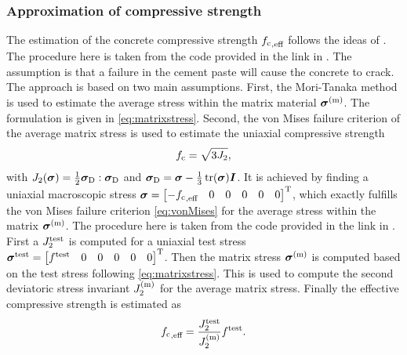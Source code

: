 \subsubsection{Approximation of compressive strength}\label{ssec:compressivestrength}
The estimation of the concrete compressive strength ${f_{\text{c}}}_{,\text{eff}}$ follows the ideas of \cite{nev_2018_mcam}.
The procedure here is taken from the code provided in the link in \cite{nee_2012_ammf}.
The assumption is that a failure in the cement paste will cause the concrete to crack.
The approach is based on two main assumptions.
First, the Mori-Tanaka method is used to estimate the average stress within the matrix material $\boldsymbol{\sigma}^{(\text{m})}$. 
The formulation is given in \eqref{eq:matrixstress}.
Second, the von Mises failure criterion of the average matrix stress is used to estimate the uniaxial compressive strength
\begin{align}
	{f_{\text{c}}} = \sqrt{3 J_2},  \label{eq:vonMises}
\end{align}
with $J_2(\boldsymbol{\sigma}) = \frac{1}{2} \boldsymbol{\sigma}_{\text{D}}:\boldsymbol{\sigma}_{\text{D}}$ and $\boldsymbol{\sigma}_{\text{D}} = \boldsymbol{\sigma} - \frac{1}{3}\operatorname{tr}(\boldsymbol{\sigma})\boldsymbol{I}$.
It is achieved by finding a uniaxial macroscopic stress $\boldsymbol{\sigma} = \begin{bmatrix} -{f_{\text{c}}}_{,\text{eff}} & 0 & 0 &0&0&0 \end{bmatrix}^\text{T}$, which exactly fulfills the von Mises failure criterion \eqref{eq:vonMises} for the average stress within the matrix $\boldsymbol{\sigma}^{(\text{m})}$.
The procedure here is taken from the code provided in the link in \cite{nee_2012_ammf}.
First a $J_2^{\text{test}}$ is computed for a uniaxial test stress $\boldsymbol{\sigma}^{\text{test}} = \begin{bmatrix} f^{\text{test}} & 0 & 0 &0&0&0 \end{bmatrix}^\text{T}$. 
Then the matrix stress $\boldsymbol{\sigma}^{(\text{m})}$ is computed based on the test stress following \eqref{eq:matrixstress}. 
This is used to compute the second deviatoric stress invariant $J_2^{(\text{m})}$ for the average matrix stress.
Finally the effective compressive strength is estimated as
\begin{align}
	{f_{\text{c}}}_{,\text{eff}} = \frac{J_2^{\text{test}}}{J_2^{(\text{m})}} f^{\text{test}}.
\end{align}
